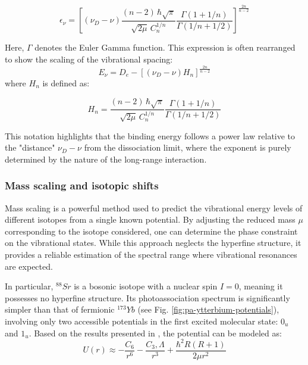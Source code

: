 \begin{equation}
    \epsilon_{\nu} = \left[ (\nu_D - \nu) \frac{(n-2)\,\hbar\sqrt{\pi}}{\sqrt{2\mu}\,C_n^{1/n}} \frac{\Gamma(1+1/n)}{\Gamma(1/n + 1/2)} \right]^{\frac{2n}{n-2}}
\end{equation}

Here, $\Gamma$ denotes the Euler Gamma function. This expression is often rearranged to show the 
scaling of the vibrational spacing:
\begin{equation}
    E_{\nu} = D_e - \left[ (\nu_D - \nu) H_n \right]^{\frac{2n}{n-2}}
\end{equation}
\label{leroy-bernstein}
where $H_n$ is defined as:

\begin{equation}
    H_n = \frac{(n-2)\,\hbar\sqrt{\pi}}{\sqrt{2\mu}\,C_n^{1/n}} \frac{\Gamma(1+1/n)}{\Gamma(1/n + 1/2)}
\end{equation}

This notation highlights that the binding energy follows a power law relative to the "distance" $\nu_D - \nu$
from the dissociation limit, where the exponent is purely determined by the nature of the long-range 
interaction.

\subsubsection{Mass scaling and isotopic shifts}

Mass scaling is a powerful method used to predict the vibrational energy levels of different isotopes 
from a single known potential. By adjusting the reduced mass $\mu$ corresponding to the isotope considered, 
one can determine the phase constraint on the vibrational states. While this approach neglects the hyperfine 
structure, it provides a reliable estimation of the spectral range where vibrational resonances are expected.

In particular, $^{88}Sr$ is a bosonic isotope with a nuclear spin $I=0$, meaning it possesses no hyperfine 
structure. Its photoassociation spectrum is significantly simpler than that of fermionic $^{173}Yb$ (see Fig. 
\ref{fig:pa-ytterbium-potentials}), involving only two accessible potentials in the first excited molecular 
state: $0_u$ and $1_u$. Based on the results presented in \cite{zelevinsky_narrow_2006}, the potential can be 
modeled as:
\begin{equation}
    U(r) \approx -\frac{C_{6}}{r^6} -\frac{C_3, \Lambda}{r^3} + \frac{\hbar^2 R(R+1)}{2\mu r^2}
\end{equation}

